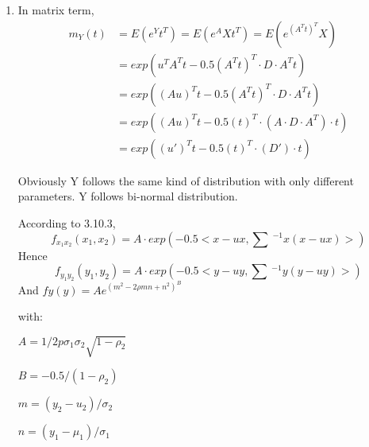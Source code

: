 \documentclass[12pt,a4paper]{article}
\makeatletter
\theoremstyle{definition}
\newtheorem*{solution}{Solution}
\renewenvironment{solution}[1][Solution] {\par\pushQED{\qed}\normalfont\topsep6\p@\@plus6\p@\relax\trivlist\item[\hskip\labelsep\bfseries#1\@addpunct{.}]\ignorespaces}{\popQED\endtrivlist\@endpefalse} \makeatother
\makeatother
\begin{document}
\begin{enumerate}[label=\roman*)]
\begin{solution}
        In matrix term,
        \begin{equation*}
            \begin{split}
                m_Y(t)&=E(e^Yt^T)=E(e^AXt^T)=E(e^{(A^Tt)^T}X)\\
                &=exp(u^TA^Tt-0.5(A^Tt)^T\cdot D\cdot A^Tt)\\
                &=exp((Au)^Tt-0.5(A^Tt)^T\cdot D\cdot A^Tt)\\
                &=exp((Au)^Tt-0.5(t)^T\cdot (A\cdot D\cdot A^T)\cdot t)\\
                &=exp((u')^Tt-0.5(t)^T\cdot (D')\cdot t)
            \end{split}
        \end{equation*}
        
        Obviously Y follows the same kind of distribution with only different parameters. Y follows bi-normal distribution.
    
        According to 3.10.3, 
        \begin{equation*}
            f_{x_1x_2}(x_1,x_2)=A\cdot exp(-0.5 < x-ux, \sum \ ^{-1} x(x-ux) > )
        \end{equation*}
        Hence
        \begin{equation*}
            f_{y_1y_2}(y_1,y_2)=A\cdot exp(-0.5<y-uy,\sum \ ^{-1}y(y-uy)>)
        \end{equation*}
        And $fy(y)=Ae^(m^2-2\rho mn+n^2)^B$
        
        with:

        $A=1/2p\sigma_1\sigma_2 \sqrt{1-\rho_2}$

        $B=-0.5/(1-\rho_2)$

        $m=(y_2-u_2)/\sigma_2$

        $n=(y_1-\mu_1)/\sigma_1$
    \end{solution}
\end{enumerate}
\end{document}
